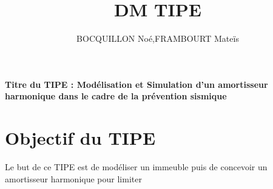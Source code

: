 \documentclass[a4paper]{article}
\author{BOCQUILLON Noé,FRAMBOURT Mateïs}
\title{DM TIPE}
\begin{document}
\maketitle 
\justifying
\paragraph{Titre du TIPE : Modélisation et Simulation d'un amortisseur \\harmonique dans le cadre de la  prévention sismique}
\section{Objectif du TIPE} 
Le but de ce TIPE est de modéliser un immeuble puis de concevoir un amortisseur harmonique pour limiter
\end{document}
